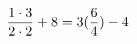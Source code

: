 \documentclass[preview]{standalone}
\begin{document}
\begin{align*}
\special{dvisvgm:raw <g id='unique000'>}\frac{1 \cdot 3}{2 \cdot 2} + 8 = 3(\frac{6}{4}) - 4\special{dvisvgm:raw </g>}
\end{align*}
\end{document}
